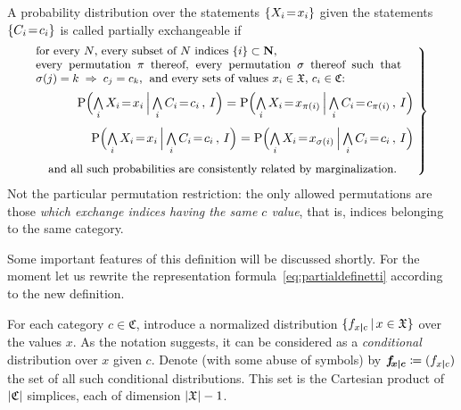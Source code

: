 \documentclass[\ifafour a4paper,12pt,\else a5paper,10pt,\fi%
onecolumn,oneside,article,%
british%
]{memoir}
\theoremstyle{remark}
\theoremstyle{innote}
\newcommand*{\NN}{\bm{\mathrm{N}}}
\newcommand*{\defd}{\coloneqq}
\newcommand*{\Land}{\mathop{\textstyle\bigwedge}}
\DeclarePairedDelimiter\abs{\lvert}{\rvert}
\DeclarePairedDelimiter\set{\{}{\}}
\newcommand*{\p}{\mathrm{P}}%
\renewcommand*{\|}[1][]{\nonscript\,#1\vert\nonscript\,\mathopen{}}
\newcommand*{\sect}{\S}%
\renewcommand*{\=}{\TextOrMath\texteq\eq}
\newcommand*{\X}[1]{X_{#1}}
\newcommand*{\x}[1]{x_{#1}}
\newcommand*{\C}[1]{C_{#1}}
\newcommand*{\cc}[1]{c_{#1}}
\newcommand*{\sx}{\mathfrak{X}}
\newcommand*{\sC}{\mathfrak{C}}
\newcommand*{\fxc}{\bm{f_{\!x\bcond c}}}
\newcommand*{\bcond}[1][]{\nonscript\,#1\bm{\vert}\nonscript\;\mathopen{}}
\begin{document}
A probability distribution over the statements $\set{\X{i}\=\x{i}}$ given
the statements $\set{\C{i}\=\cc{i}}$
is called partially exchangeable if
\begin{equation}
  \label{eq:part_exchangeable}\left.
\begin{multlined}%
  \parbox{0.85\linewidth}{\small for every $N$,
    every subset of $N$ indices $\set{i} \subset \NN$,\\
    every permutation $\pi$ thereof,
    every permutation $\sigma$ thereof such that\;
    $\sigma(j)=k \mathrel{\;\Rightarrow\;} \cc{j}=\cc{k}$,\; and every sets of
    values $\x{i}\in \sx$, $\cc{i}\in \sC$:}
  \\[\jot]
  \shoveright{\p\Bigl( \Land_{i}\X{i}\=\x{i}  \|[\Big]
    \Land_{i}\C{i}\=\cc{i}\,,\,    I\Bigr) =
    \p\Bigl( \Land_{i}\X{i}\=\x{\pi(i)}  \|[\Big]
    \Land_{i}\C{i}\=\cc{\pi(i)}\,,\,    I\Bigr)}
  \\[\jot]
  \shoveright{\p\Bigl( \Land_{i}\X{i}\=\x{i}  \|[\Big]
    \Land_{i}\C{i}\=\cc{i}\,,\,    I\Bigr) =
    \p\Bigl( \Land_{i}\X{i}\=\x{\sigma(i)}  \|[\Big]
    \Land_{i}\C{i}\=\cc{i}\,,\,    I\Bigr)}
  \\[\jot]
  \shoveleft{\text{\small and all such probabilities are consistently related by marginalization.}}
\end{multlined}\;\right\}
\end{equation}
Not the particular permutation restriction: the only allowed permutations
are those \emph{which exchange indices having the same $c$ value}, that is,
indices belonging to the same category.

Some important features of this definition will be discussed shortly. For
the moment
let us rewrite the representation formula~\eqref{eq:partialdefinetti}
according to the new definition.


For each category $c \in \sC$, introduce a normalized distribution
$\set{f_{x \bcond c} \| x \in \sx}$ over the values $x$. As the notation
suggests, it can be considered as a \emph{conditional} distribution over
$x$ given $c$. Denote (with some abuse of symbols) by
$\fxc \defd (f_{x \bcond c})$ the set of all such conditional
distributions. This set is the Cartesian product of $\abs{\sC}$ simplices,
each of dimension $\abs{\sx}-1$.
\end{document}
